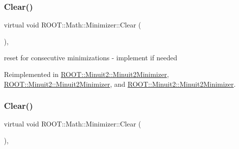 \mbox{\label{classROOT_1_1Math_1_1Minimizer_ad7308846baecf68fb0dbc2d5e4caa178}} 
\subsubsection{\texorpdfstring{Clear()}{Clear()}\hspace{0.1cm}{\footnotesize\ttfamily [2/3]}}
{\footnotesize\ttfamily virtual void R\+O\+O\+T\+::\+Math\+::\+Minimizer\+::\+Clear (\begin{DoxyParamCaption}{ }\end{DoxyParamCaption})\hspace{0.3cm}{\ttfamily [inline]}, {\ttfamily [virtual]}}



reset for consecutive minimizations -\/ implement if needed 



Reimplemented in \mbox{\hyperlink{classROOT_1_1Minuit2_1_1Minuit2Minimizer_a11e6ce9a4285080548f9855b78ca83b4}{R\+O\+O\+T\+::\+Minuit2\+::\+Minuit2\+Minimizer}}, \mbox{\hyperlink{classROOT_1_1Minuit2_1_1Minuit2Minimizer_a11e6ce9a4285080548f9855b78ca83b4}{R\+O\+O\+T\+::\+Minuit2\+::\+Minuit2\+Minimizer}}, and \mbox{\hyperlink{classROOT_1_1Minuit2_1_1Minuit2Minimizer_a11e6ce9a4285080548f9855b78ca83b4}{R\+O\+O\+T\+::\+Minuit2\+::\+Minuit2\+Minimizer}}.

\mbox{\label{classROOT_1_1Math_1_1Minimizer_ad7308846baecf68fb0dbc2d5e4caa178}} 
\subsubsection{\texorpdfstring{Clear()}{Clear()}\hspace{0.1cm}{\footnotesize\ttfamily [3/3]}}
{\footnotesize\ttfamily virtual void R\+O\+O\+T\+::\+Math\+::\+Minimizer\+::\+Clear (\begin{DoxyParamCaption}{ }\end{DoxyParamCaption})\hspace{0.3cm}{\ttfamily [inline]}, {\ttfamily [virtual]}}



